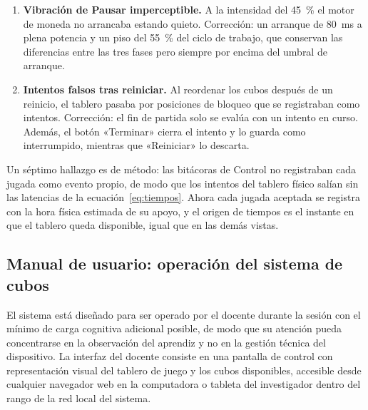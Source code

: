 \documentclass{book}
\begin{document}
\begin{enumerate}
    \item \textbf{Vibración de Pausar imperceptible.} A la intensidad del 45~\% el motor de moneda no arrancaba estando quieto. Corrección: un arranque de 80~ms a plena potencia y un piso del 55~\% del ciclo de trabajo, que conservan las diferencias entre las tres fases pero siempre por encima del umbral de arranque.
    \item \textbf{Intentos falsos tras reiniciar.} Al reordenar los cubos después de un reinicio, el tablero pasaba por posiciones de bloqueo que se registraban como intentos. Corrección: el fin de partida solo se evalúa con un intento en curso. Además, el botón «Terminar» cierra el intento y lo guarda como interrumpido, mientras que «Reiniciar» lo descarta.
\end{enumerate}

Un séptimo hallazgo es de método: las bitácoras de Control no registraban cada jugada como evento propio, de modo que los intentos del tablero físico salían sin las latencias de la ecuación~\eqref{eq:tiempos}. Ahora cada jugada aceptada se registra con la hora física estimada de su apoyo, y el origen de tiempos es el instante en que el tablero queda disponible, igual que en las demás vistas.
 
\subsection{Manual de usuario: operación del sistema de cubos}
 
El sistema está diseñado para ser operado por el docente durante la
sesión con el mínimo de carga cognitiva adicional posible, de modo que su
atención pueda concentrarse en la observación del aprendiz y no en la
gestión técnica del dispositivo. La interfaz del docente consiste en una
pantalla de control con representación visual del tablero de juego y los
cubos disponibles, accesible desde cualquier navegador web en la
computadora o tableta del investigador dentro del rango de la red local
del sistema.
 
\end{document}
